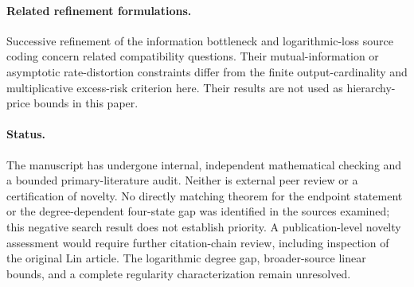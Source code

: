 \documentclass[11pt]{article}
\theoremstyle{definition}\newtheorem{definition}[theorem]{Definition}
\theoremstyle{remark}\newtheorem{remark}[theorem]{Remark}
\begin{document}
\paragraph{Related refinement formulations.}
Successive refinement of the information bottleneck \cite{charvin} and logarithmic-loss source coding \cite{no} concern related compatibility questions. Their mutual-information or asymptotic rate-distortion constraints differ from the finite output-cardinality and multiplicative excess-risk criterion here. Their results are not used as hierarchy-price bounds in this paper.

\paragraph{Status.}
The manuscript has undergone internal, independent mathematical checking and a bounded primary-literature audit. Neither is external peer review or a certification of novelty. No directly matching theorem for the endpoint statement or the degree-dependent four-state gap was identified in the sources examined; this negative search result does not establish priority. A publication-level novelty assessment would require further citation-chain review, including inspection of the original Lin article. The logarithmic degree gap, broader-source linear bounds, and a complete regularity characterization remain unresolved.
\end{document}
